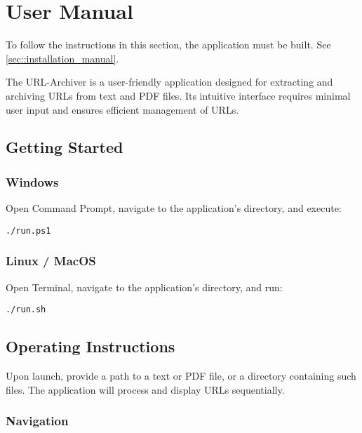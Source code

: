 \section{User Manual}
\begin{bfhWarnBox}
	To follow the instructions in this section, the application must be built. See \ref{sec::installation_manual}.
\end{bfhWarnBox}

The URL-Archiver is a user-friendly application designed for extracting and archiving URLs from text and PDF files. Its intuitive interface requires minimal user input and ensures efficient management of URLs.

\subsection{Getting Started}

\subsubsection{Windows}

Open Command Prompt, navigate to the application's directory, and execute:

\begin{lstlisting}[numbers=none]
./run.ps1
\end{lstlisting}

\subsubsection{Linux / MacOS}

Open Terminal, navigate to the application's directory, and run:

\begin{lstlisting}[numbers=none]
./run.sh
\end{lstlisting}

\subsection{Operating Instructions}

Upon launch, provide a path to a text or PDF file, or a directory containing such files. The application will process and display URLs sequentially.

\subsubsection{Navigation}

